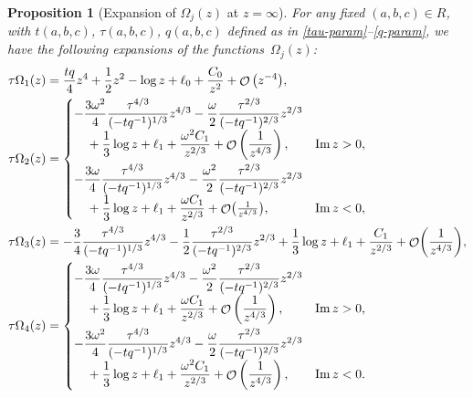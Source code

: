 \documentclass[10pt,a4paper]{amsart}
\DeclareMathOperator{\OO}{\mathcal{O}}
\numberwithin{equation}{section}
\newtheorem{Proposition}[Theorem]{Proposition}
 { \theoremstyle{definition}
\newtheorem{Definition}[Theorem]{Definition}
\newtheorem{Note}[Theorem]{Note}
\newtheorem{Example}[Theorem]{Example}
\newtheorem{Remark}[Theorem]{Remark} }
\begin{document}
 \begin{Proposition}[Expansion of $\Omega_j(z)$ at $z=\infty$] For any fixed $(a,b,c)\in R$, with $t(a,b,c)$, $\tau(a,b,c)$, $q(a,b,c)$ defined as in
 \eqref{tau-param}--\eqref{q-param}, we have the following expansions of the functions~$\Omega_j(z)$:
 \begin{align}
 &\tau \Omega_1(z) = \frac{t q}{4}z^4 + \frac{1}{2}z^2 - \log z + \ell_0 + \frac{C_0}{z^2} + \OO\big(z^{-4}\big), \label{Omega-Sheet-1-infty}\\
 &\tau \Omega_{2}(z) = \begin{cases}
 -\dfrac{3\omega^2}{4}\dfrac{\tau^{4/3}}{(-tq^{-1})^{1/3}}z^{4/3} - \dfrac{\omega}{2} \dfrac{\tau^{2/3}}{(-tq^{-1})^{2/3}} z^{2/3} & \\
 \quad{}+ \dfrac{1}{3}\log z+ \ell_1 + \dfrac{\omega^2 C_1}{z^{2/3}} + \OO\left(\dfrac{1}{z^{4/3}}\right), & \operatorname{Im} z > 0, \vspace{1mm}\\
 -\dfrac{3\omega}{4}\dfrac{\tau^{4/3}}{(-tq^{-1})^{1/3}}z^{4/3} - \dfrac{\omega^2}{2} \dfrac{\tau^{2/3}}{(-tq^{-1})^{2/3}} z^{2/3} & \\
 \quad{} + \dfrac{1}{3}\log z+ \ell_1 + \dfrac{\omega C_1}{z^{2/3}}+ \OO\bigl(\frac{1}{z^{4/3}}\bigr), & \operatorname{Im} z < 0,
 \end{cases} \label{Omega-Sheet-2-infty}\\
 &\tau \Omega_{3}(z) = -\frac{3}{4}\frac{\tau^{4/3}}{(-tq^{-1})^{1/3}}z^{4/3} - \frac{1}{2} \frac{\tau^{2/3}}{(-tq^{-1})^{2/3}} z^{2/3} + \frac{1}{3}\log z + \ell_1 + \frac{C_1}{z^{2/3}} + \OO\biggl(\frac{1}{z^{4/3}}\biggr),\label{Omega-Sheet-3-infty}\\
 &\tau \Omega_{4}(z) = \begin{cases}
 -\dfrac{3\omega}{4}\dfrac{\tau^{4/3}}{(-tq^{-1})^{1/3}}z^{4/3} - \dfrac{\omega^2}{2} \dfrac{\tau^{2/3}}{(-tq^{-1})^{2/3}} z^{2/3} & \\
 \quad{} + \dfrac{1}{3}\log z+ \ell_1 + \dfrac{\omega C_1}{z^{2/3}}+ \OO\left(\dfrac{1}{z^{4/3}}\right), & \operatorname{Im} z > 0, \vspace{1mm}\\
 -\dfrac{3\omega^2}{4}\dfrac{\tau^{4/3}}{(-tq^{-1})^{1/3}}z^{4/3} - \dfrac{\omega}{2} \dfrac{\tau^{2/3}}{(-tq^{-1})^{2/3}} z^{2/3} &\\
 \quad{} + \dfrac{1}{3}\log z+ \ell_1 + \dfrac{\omega^2 C_1}{z^{2/3}} + \OO\left(\dfrac{1}{z^{4/3}}\right),& \operatorname{Im} z < 0.
 \end{cases}\label{Omega-Sheet-4-infty}

\end{align}
\end{Proposition}
\end{document}
